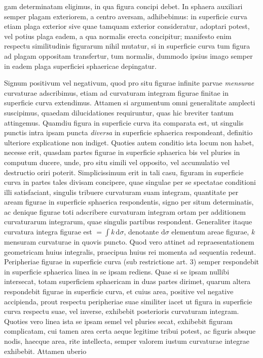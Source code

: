 %
gam determinatam eligimus, in qua figura concipi debet. In sphaera auxiliari semper plagam exteriorem, a centro aversam, adhibebimus: in superficie curva etiam plaga exterior sive quae tamquam exterior consideratur, adoptari potest, vel potius plaga eadem, a qua normalis erecta concipitur; manifesto enim respectu similitudinis figurarum nihil mutatur, si in superficie curva tum figura ad plagam oppositam transfertur, tum normalis, dummodo ipsius imago semper in eadem plaga superficiei sphaericae depingatur.

Signum positivum vel negativum, quod pro situ figurae infinite parvae \textit{mensurae} curvaturae adscribimus, etiam ad curvaturam integram figurae finitae in superficie curva extendimus. Attamen si argumentum omni generalitate amplecti suscipimus, quaedam dilucidationes requiruntur, quas hic breviter tantum attingemus. Quamdiu figura in superficie curva ita comparata est, ut singulis punctis intra ipsam puncta \textit{diversa} in superficie sphaerica respondeant, definitio ulteriore explicatione non indiget. Quoties autem conditio ista locum non habet, necesse erit, quasdam partes figurae in superficie sphaerica bis vel pluries in computum ducere, unde, pro situ simili vel opposito, vel accumulatio vel destructio oriri poterit. Simplicissimum erit in tali casu, figuram in superficie curva in partes tales divisam concipere, quae singulae per se spectatae conditioni illi satisfaciant, singulis tribuere curvaturam suam integram, quantitate per aream figurae in superficie sphaerica respondentis, signo per situm determinatis, ac denique figurae toti adscribere curvaturam integram ortam per additionem curvaturarum integrarum, quae singulis partibus respondent. Generaliter itaque curvatura integra figurae est \(=\int k\,\mathrm{d}\sigma\), denotante \(\mathrm{d}\sigma\) elementum areae figurae, \(k\) mensuram curvaturae in quovis puncto. Quod vero attinet ad repraesentationem geometricam huius integralis, praecipua huius rei momenta ad sequentia redeunt. Peripheriae figurae in superficie curva (sub restrictione art. 3) semper respondebit in superficie sphaerica linea in se ipsam rediens. Quae si se ipsam nullibi intersecat, totam superficiem sphaericam in duas partes dirimet, quarum altera respondebit figurae in superficie curva, et cuius area, positive vel negative accipienda, prout respectu peripheriae suae similiter iacet ut figura in superficie curva respectu suae, vel inverse, exhibebit posterioris curvaturam integram. Quoties vero linea ista se ipsam semel vel pluries secat, exhibebit figuram complicatam, cui tamen area certa aeque legitime tribui potest, ac figuris absque nodis, haecque area, rite intellecta, semper valorem iustum curvaturae integrae exhibebit. Attamen uberio%
